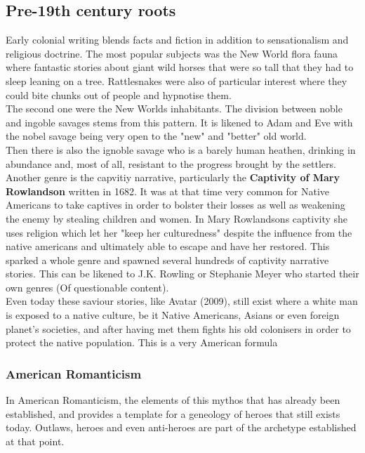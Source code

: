 \documentclass{article}
\begin{document}
	\subsection{Pre-19th century roots}
	Early colonial writing blends facts and fiction in addition to sensationalism and religious doctrine. The most popular subjects was the New World flora fauna where fantastic stories about giant wild horses that were so tall that they had to sleep leaning on a tree. Rattlesnakes were also of particular interest where they could bite chunks out of people and hypnotise them. \\
	The second one were the New Worlds inhabitants. The division between noble and ingoble savages stems from this pattern. It is likened to Adam and Eve with the nobel savage being very open to the "new" and "better" old world. \\
	Then there is also the ignoble savage who is a barely human heathen, drinking in abundance and, most of all, resistant to the progress brought by the settlers. \\
	Another genre is the capvitiy narrative, particularly the \textbf{Captivity of Mary Rowlandson} written in 1682. It was at that time very common for Native Americans to take captives in order to bolster their losses as well as weakening the enemy by stealing children and women. In Mary Rowlandsons captivity she uses religion which let her "keep her culturedness" despite the influence from the native americans and ultimately able to escape and have her restored. This sparked a whole genre and spawned several hundreds of captivity narrative stories. This can be likened to J.K. Rowling or Stephanie Meyer who started their own genres (Of questionable content). \\
	Even today these saviour stories, like Avatar (2009), still exist where a white man is exposed to a native culture, be it Native Americans, Asians or even foreign planet's societies, and after having met them fights his old colonisers in order to protect the native population. This is a very American formula
	\subsubsection{American Romanticism}
	In American Romanticism, the elements of this mythos that has already been established, and provides a template for a geneology of heroes that still exists today. Outlaws, heroes and even anti-heroes are part of the archetype established at that point. \\
\end{document}
